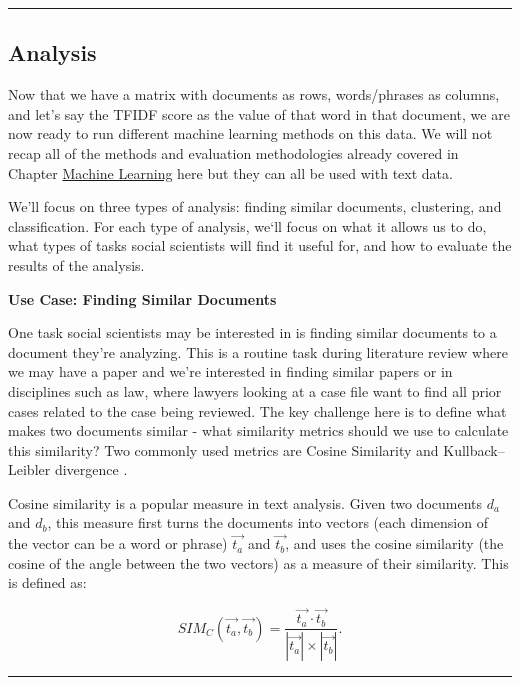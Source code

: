 \documentclass[]{krantz}
\begin{document}
\begin{center}\rule{0.5\linewidth}{\linethickness}\end{center}

\subsection{Analysis}\label{analysis}

Now that we have a matrix with documents as rows, words/phrases as
columns, and let's say the TFIDF score as the value of that word in that
document, we are now ready to run different machine learning methods on
this data. We will not recap all of the methods and evaluation
methodologies already covered in Chapter
\protect\hyperlink{chap:ml}{Machine Learning} here but they can all be
used with text data.

We'll focus on three types of analysis: finding similar documents,
clustering, and classification. For each type of analysis, we`ll focus
on what it allows us to do, what types of tasks social scientists will
find it useful for, and how to evaluate the results of the analysis.

\textbf{Use Case: Finding Similar Documents}

One task social scientists may be interested in is finding similar
documents to a document they're analyzing. This is a routine task during
literature review where we may have a paper and we're interested in
finding similar papers or in disciplines such as law, where lawyers
looking at a case file want to find all prior cases related to the case
being reviewed. The key challenge here is to define what makes two
documents similar - what similarity metrics should we use to calculate
this similarity? Two commonly used metrics are Cosine Similarity and
Kullback--Leibler divergence \citep{kullback1951information}.

Cosine similarity is a popular measure in text analysis. Given two
documents \(d_a\) and \(d_b\), this measure first turns the documents
into vectors (each dimension of the vector can be a word or phrase)
\(\overrightarrow{t_a}\) and \(\overrightarrow{t_b}\), and uses the
cosine similarity (the cosine of the angle between the two vectors) as a
measure of their similarity. This is defined as:

\[SIM_C(\overrightarrow{t_a},\overrightarrow{t_b}) = \frac{\overrightarrow{t_a} \cdot
     \overrightarrow{t_b}}{|\overrightarrow{t_a}|\times|\overrightarrow{t_b}|}.\]

\begin{center}\rule{0.5\linewidth}{\linethickness}\end{center}
\end{document}
